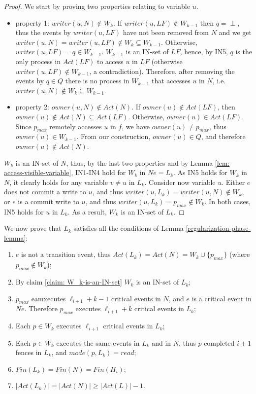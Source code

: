 \begin{proof}

We start by proving two properties relating to variable $u$.

\begin{itemize}

\item property 1: $writer(u,N) \notin W_k$. If $writer(u, L F) \notin W_{k-1}$ then $q = \perp$, thus the events by $writer(u, L F)$ have not been removed from $N$ and we get $writer(u, N) = writer(u, L F) \notin W_k \subseteq W_{k-1}$. Otherwise, $writer(u, L F) = q \in W_{k-1}$. $W_{k-1}$ is an IN-set of $L F$, hence, by IN5, $q$ is the only process in $Act(L F)$ to access $u$ in $L F$ (otherwise $writer(u, L F) \notin W_{k-1}$, a contradiction). Therefore, after removing the events by $q \in Q$ there is no process in $W_{k-1}$ that accesses $u$ in $N$, i.e. $writer(u, N) \notin W_k \subseteq W_{k-1}$.
    
\item property 2: $owner(u,N) \notin Act(N)$. If $owner(u) \notin Act(L F)$, then $owner(u) \notin Act(N) \subseteq Act(L F)$. Otherwise, $owner(u) \in Act(L F)$. Since $p_{max}$ remotely accesses $u$ in $f$, we have $owner(u) \neq p_{max}$, thus  $owner(u) \in W_{k-1}$. From our construction, $owner(u) \in Q$, and therefore $owner(u) \notin Act(N)$.
    
\end{itemize}
	
	$W_k$ is an IN-set of $N$, thus, by the last two properties and by Lemma \ref{lem: access-visible-variable}, IN1-IN4 hold for $W_k$ in $N e = L_k$. As IN5 holds for $W_k$ in $N$, it clearly holds for any variable $v \neq u$ in $L_k$. Consider now variable $u$. Either $e$ does not commit a write to $u$, and thus $writer(u,L_k) = writer(u,N) \notin W_k$, or $e$ is a commit write to $u$, and thus $writer(u,L_k) = p_{max} \notin W_k$. In both cases, IN5 holds for $u$ in $L_k$. As a result, $W_k$ is an IN-set of $L_k$.
\end{proof}

We now prove that $L_k$ satisfies all the conditions of Lemma \ref{regularization-phase-lemma}:
\begin{enumerate} [(1)]
	\item $e$ is not a transition event, thus $Act(L_k) = Act(N) = W_k \cup \{p_{max}\}$ (where $p_{max} \notin W_k$);
	\item By claim \ref{claim: W_k-is-an-IN-set} $W_k$ is an IN-set of $L_k$;
	\item $p_{max}$ eamxecutes $\ell_{i+1}+k-1$ critical events in $N$, and $e$ is a critical event in $N e$. Therefore $p_{max}$ executes $\ell_{i+1}+k$ critical events in $L_k$;
	\item Each $p \in W_k$ executes $\ell_{i+1}$ critical events in $L_k$;
	\item Each $p \in W_k$ executes the same events in $L_k$ and in $N$, thus $p$ completed $i+1$ fences in $L_k$, and $mode(p,L_k) = read$;
	\item $Fin(L_k) = Fin(N) = Fin(H_i)$;
	\item $|Act(L_k)| = |Act(N)| \geq |Act(L)|-1$.
\end{enumerate}

